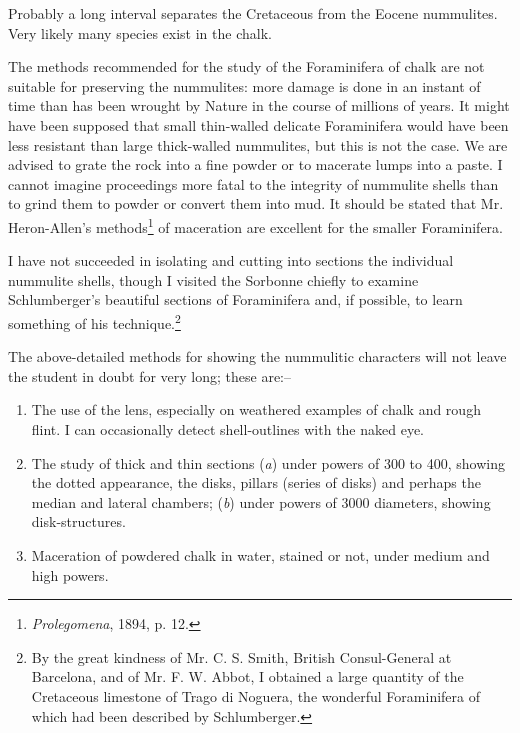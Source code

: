 \documentclass[a4paper, 12pt, oneside, landscape]{article}
\begin{document}
Probably a long interval separates the Cretaceous from the Eocene nummulites. Very likely many species exist in the chalk.

The methods recommended for the study of the Foraminifera of chalk are not suitable for preserving the nummulites: more damage is done in an instant of time than has been wrought by Nature in the course of millions of years. It might have been supposed that small thin-walled delicate Foraminifera would have been less resistant than large thick-walled nummulites, but this is not the case. We are advised to grate the rock into a fine powder or to macerate lumps into a paste. I cannot imagine proceedings more fatal to the integrity of nummulite shells than to grind them to powder or convert them into mud. It should be stated that Mr. Heron-Allen's methods\footnote{\emph{Prolegomena}, 1894, p. 12.} of maceration are excellent for the smaller Foraminifera.

I have not succeeded in isolating and cutting into sections the individual nummulite shells, though I visited the Sorbonne chiefly to examine Schlumberger's beautiful sections of Foraminifera and, if possible, to learn something of his technique.\footnote{By the great kindness of Mr. C. S. Smith, British Consul-General at Barcelona, and of Mr. F. W. Abbot, I obtained a large quantity of the Cretaceous limestone of Trago di Noguera, the wonderful Foraminifera of which had been described by Schlumberger.}

The above-detailed methods for showing the nummulitic characters will not leave the student in doubt for very long; these are:--
\begin{enumerate}
\item The use of the lens, especially on weathered examples of chalk and rough flint. I can occasionally detect shell-outlines with the naked eye.

\item The study of thick and thin sections (\emph{a}) under powers of 300 to 400, showing the dotted appearance, the disks, pillars (series of disks) and perhaps the median and lateral chambers; (\emph{b}) under powers of 3000 diameters, showing disk-structures.

\item Maceration of powdered chalk in water, stained or not, under medium and high powers.
\end{enumerate}
\end{document}
